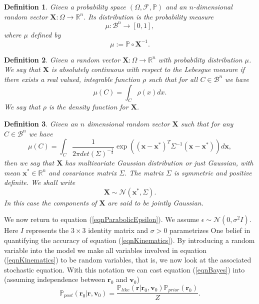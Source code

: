 \documentclass[12pt]{book}
\newtheorem{definition}{Definition}
\newcommand{\post}{\mathbb{P}_{post}}
\newcommand{\like}{\mathbb{P}_{like}}
\newcommand{\prior}{\mathbb{P}_{prior}}
\newcommand{\p}{\mathbb{P}}
\begin{document}
\begin{definition}
Given a probability space $(\Omega,\mathscr{F},\p)$ and an $n$-dimensional  random vector 
$\mathbf{X}:\Omega\rightarrow\mathbb{R}^{n}$.
Its distribution  is the probability measure
\begin{equation*}
\mu:\mathcal{B}^{n}\rightarrow [0,1],
\end{equation*}
where  $\mu$ defined by 
\begin{equation*}
\mu:=\p\circ \textbf{X}^{-1}.
\end{equation*}
\end{definition}
\begin{definition}
Given a random vector $\textbf{X}:\Omega\rightarrow\mathbb{R}^{n}$ with
probability distribution $\mu$. We say that $\mathbf{X}$ is absolutely 
continuous with respect to the Lebesgue measure if there exists a real valued, integrable function $\rho$
such that for all $C\in\mathcal{B}^{n}$ we have
\begin{equation*}
\mu(C)=\int_{C}\rho(x)dx.
\end{equation*}
We say that $\rho$ is the density function for $\mathbf{X}$.
\end{definition}
\begin{definition}\label{dfnrandonvariables}
Given an $n$ dimensional random vector $\mathbf{X}$ such that for any 
$C\in\mathcal{B}^{n}$ we have
\begin{equation}\label{eqnmultivariateGaussianDefinition}
\mu(C)=\int_{C}
\frac{1}{2\pi det(\Sigma)^{-\frac{1}{2}}}\exp((\textbf{x}-\textbf{x}^{*})^{T}\Sigma^{-1}
(\textbf{x}-\textbf{x}^{*}))d\textbf{x},
\end{equation}
then we say
that $\textbf{X}$ has multivariate Gaussian distribution or just Gaussian, 
with mean $\textbf{x}^{*}\in\mathbb{R}^{n}$
and covariance matrix $\Sigma$. The matrix $\Sigma$ is symmetric and positive definite. We shall write
\begin{equation}\label{eqnMultivariate}
\textbf{X}\sim \mathcal{N}(\textbf{x}^{*},\Sigma).
\end{equation}
In this case the components of $\textbf{X}$ are said to be \textit{jointly Gaussian}.
\end{definition}

We now return to equation (\ref{eqnParabolicEpsilon}). We assume $\epsilon\sim\mathcal{N}(0,\sigma^{2}I)$.
Here $I$
represents the $3\times 3$ identity matrix and $\sigma>0$ parametrizes One belief in quantifying the 
accuracy  
of equation (\ref{eqnKinematics}).  By introducing a random variable into the model
we make all variables involved  in equation (\ref{eqnKinematics})
to be  random variables, that is, we now look at the  associated stochastic equation. With this notation
we can cast equation (\ref{eqnBayes}) into  (assuming independence between $\textbf{r}_{0}$ and $\textbf{v}_{0}$)
\begin{equation}\label{eqnpostrock}
\post(\textbf{r}_{0}|\textbf{r},\textbf{v}_{0})=\frac{\like(\textbf{r}|\textbf{r}_{0},\textbf{v}_{0})
\prior(\textbf{r}_{0})}{Z}.
\end{equation}
\end{document}
